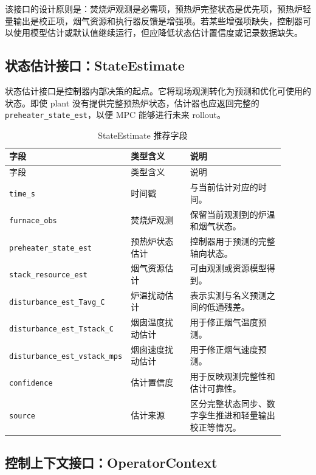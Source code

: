 \documentclass[UTF8,openany,zihao=-4,oneside]{ctexbook}
\begin{document}
该接口的设计原则是：焚烧炉观测是必需项，预热炉完整状态是优先项，预热炉轻量输出是校正项，烟气资源和执行器反馈是增强项。若某些增强项缺失，控制器可以使用模型估计或默认值继续运行，但应降低状态估计置信度或记录数据缺失。

\subsection{状态估计接口：StateEstimate}\label{subsec:stateestimate}

状态估计接口是控制器内部决策的起点。它将现场观测转化为预测和优化可使用的状态。即使 plant 没有提供完整预热炉状态，估计器也应返回完整的 \texttt{preheater\_state\_est}，以便 MPC 能够进行未来 rollout。

\begin{longtable}{@{}p{0.25\linewidth}p{0.25\linewidth}p{0.40\linewidth}@{}}
\caption{StateEstimate 推荐字段}\label{tab:stateestimate}\\
\toprule
字段 & 类型含义 & 说明 \\
\midrule
\endfirsthead
\toprule
字段 & 类型含义 & 说明 \\
\midrule
\endhead
\texttt{time\_s} & 时间戳 & 与当前估计对应的时间。 \\
\texttt{furnace\_obs} & 焚烧炉观测 & 保留当前观测到的炉温和烟气状态。 \\
\texttt{preheater\_state\_est} & 预热炉状态估计 & 控制器用于预测的完整轴向状态。 \\
\texttt{stack\_resource\_est} & 烟气资源估计 & 可由观测或资源模型得到。 \\
\texttt{disturbance\_est\_Tavg\_C} & 炉温扰动估计 & 表示实测与名义预测之间的低通残差。 \\
\texttt{disturbance\_est\_Tstack\_C} & 烟囱温度扰动估计 & 用于修正烟气温度预测。 \\
\texttt{disturbance\_est\_vstack\_mps} & 烟囱速度扰动估计 & 用于修正烟气速度预测。 \\
\texttt{confidence} & 估计置信度 & 用于反映观测完整性和估计可靠性。 \\
\texttt{source} & 估计来源 & 区分完整状态同步、数字孪生推进和轻量输出校正等情况。 \\
\bottomrule
\end{longtable}

\subsection{控制上下文接口：OperatorContext}\label{subsec:operatorcontext}
\end{document}
